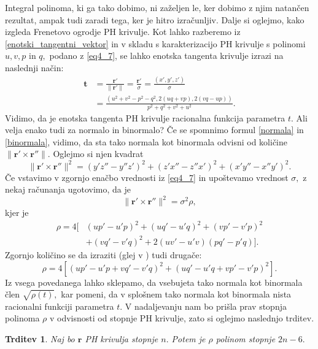 \documentclass[12pt,a4paper,twoside]{article}
\theoremstyle{definition} %
\theoremstyle{plain} %
\newtheorem{trditev}[definicija]{Trditev}
\theoremstyle{primerstyle}
\numberwithin{equation}{section}  %
\newcommand{\tV}{\mathbf{t}}
\newcommand{\rV}{\mathbf{r}}
\begin{document}
Integral polinoma, ki ga tako dobimo, ni zaželjen le, ker dobimo z njim natančen rezultat, ampak tudi zaradi tega, ker je hitro izračunljiv. Dalje si oglejmo, kako izgleda Frenetovo ogrodje PH krivulje. Kot lahko razberemo iz \eqref{enotski_tangentni_vektor} in v skladu s karakterizacijo PH krivulje s polinomi $u,v,p$ in $q,$ podano z \eqref{eq4_7}, se lahko enotska tangenta krivulje izrazi na naslednji način:
\begin{align}
	\tV&=\frac{\rV'}{\lVert \rV' \rVert}=\frac{\rV'}{\sigma}=\frac{(x',y',z')}{\sigma} \nonumber \\
	&=\frac{(u^2+v^2-p^2-q^2,2(uq+vp),2(vq-up))}{p^2+q^2+v^2+u^2}.
\end{align}
Vidimo, da je enotska tangenta PH krivulje racionalna funkcija parametra $t.$ Ali velja enako tudi za normalo in binormalo? Če se spomnimo formul \eqref{normala} in \eqref{binormala}, vidimo, da sta tako normala kot binormala odvisni od količine $\lVert \rV' \times \rV'' \rVert.$ Oglejmo si njen kvadrat
\begin{equation}
	\label{eq4_12}
	\lVert \rV' \times \rV'' \rVert^2=(y'z''-y''z')^2+(z'x''-z''x')^2+(x'y''-x''y')^2.
\end{equation}
Če vstavimo v zgornjo enačbo vrednosti iz \eqref{eq4_7} in upoštevamo vrednost $\sigma,$ z nekaj računanja \cite[str.\ 386]{farouki2002exact} ugotovimo, da je
\begin{equation}
	\label{eq4_13}
	\lVert \rV' \times \rV'' \rVert^2=\sigma^2\rho,
\end{equation}
kjer je
\begin{align}
	\rho=4[&(up'-u'p)^2+(uq'-u'q)^2+(vp'-v'p)^2 \nonumber \\
	&+(vq'-v'q)^2+2(uv'-u'v)(pq'-p'q)]. \label{rho1}
\end{align}
Zgornjo količino se da izraziti (glej v \cite[str.\ 118]{beltranmonterde}) tudi drugače:
\begin{equation}
	\label{rho2}
	\rho=4[(up'-u'p+vq'-v'q)^2+(uq'-u'q+vp'-v'p)^2].
\end{equation}
Iz vsega povedanega lahko sklepamo, da vsebujeta tako normala kot binormala člen $\sqrt{\rho(t)},$ kar pomeni, da v splošnem tako normala kot binormala nista racionalni funkciji parametra $t.$ V nadaljevanju nam bo prišla prav stopnja polinoma $\rho$ v odvisnosti od stopnje PH krivulje, zato si oglejmo naslednjo trditev.
\begin{trditev}
	\label{stopnja_rho_trditev}
	Naj bo $\rV$ PH krivulja stopnje $n.$ Potem je $\rho$ polinom stopnje $2n-6.$
\end{trditev}
\end{document}
